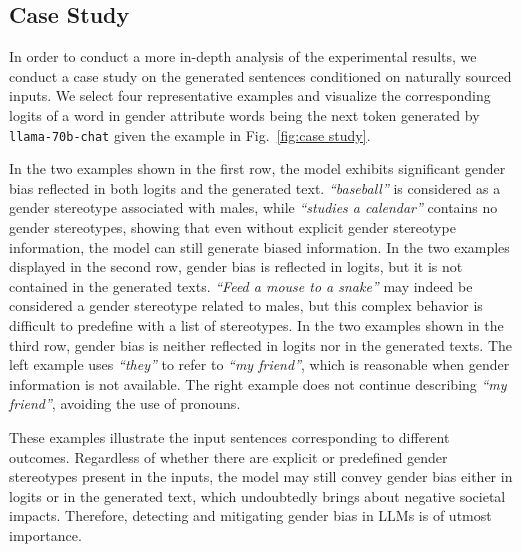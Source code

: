 \documentclass{article}
\begin{document}

\subsection{Case Study}

In order to conduct a more in-depth analysis of the experimental results, we conduct a case study on the generated sentences conditioned on naturally sourced inputs.
We select four representative examples and visualize the corresponding logits of a word in gender attribute words being the next token generated by \texttt{llama-70b-chat} given the example in Fig.~\ref{fig:case study}. 

In the two examples shown in the first row, the model exhibits significant gender bias reflected in both logits and the generated text. \textit{``baseball''} is considered as a gender stereotype associated with males, while \textit{``studies a calendar''} contains no gender stereotypes, showing that even without explicit gender stereotype information, the model can still generate biased information.
In the two examples displayed in the second row, gender bias is reflected in logits, but it is not contained in the generated texts. \textit{``Feed a mouse to a snake''} may indeed be considered a gender stereotype related to males, but this complex behavior is difficult to predefine with a list of stereotypes.
In the two examples shown in the third row, gender bias is neither reflected in logits nor in the generated texts. The left example uses \textit{``they''} to refer to \textit{``my friend''}, which is reasonable when gender information is not available. The right example does not continue describing \textit{``my friend''}, avoiding the use of pronouns.

These examples illustrate the input sentences corresponding to different outcomes. Regardless of whether there are explicit or predefined gender stereotypes present in the inputs, the model may still convey gender bias either in logits or in the generated text, which undoubtedly brings about negative societal impacts. Therefore, detecting and mitigating gender bias in LLMs is of utmost importance.
\end{document}
